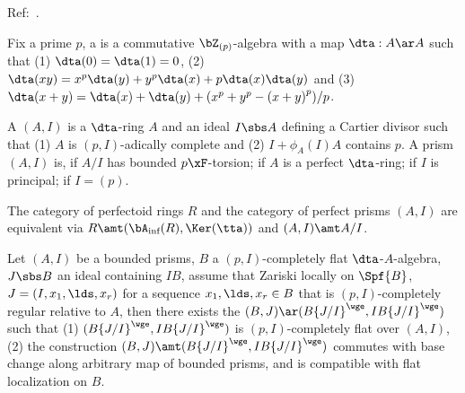 \documentclass[a4paper, twoside]{article}
\begin{document}











Ref:~\cite{BS2022Prisms}.

\begin{dfn}
	Fix a prime $p$, a  is a commutative $\bZ_{(p)}$-algebra with a map $\dta:A\ar A$ such that (1) $\dta(0)=\dta(1)=0$, (2) $\dta(xy)=x^{p}\dta(y)+y^{p}\dta(x)+p\dta(x)\dta(y)$ and (3) $\dta(x+y)=\dta(x)+\dta(y)+(x^{p}+y^{p}-{(x+y)}^{p})/p$.

	A  $(A,I)$ is a $\dta$-ring $A$ and an ideal $I\sbs A$ defining a Cartier divisor such that (1) $A$ is $(p,I)$-adically complete and (2) $I+\phi_{A}(I)A$ contains $p$. A prism $(A,I)$ is,  if $A/I$ has bounded $p\xF$-torsion;  if $A$ is a perfect $\dta$-ring;  if $I$ is principal;  if $I=(p)$.
\end{dfn}

\begin{thm}
	The category of perfectoid rings $R$ and the category of perfect prisms $(A,I)$ are equivalent via $R\amt(\bA_{\text{inf}}(R),\Ker(\tta))$ and $(A,I)\amt A/I$.
\end{thm}

\begin{thm}
	Let $(A,I)$ be a bounded prisms, $B$ a $(p,I)$-completely flat $\dta$-$A$-algebra, $J\sbs B$ an ideal containing $IB$, assume that Zariski locally on $\Spf{B}$, $J=(I,x_{1},\lds,x_{r})$ for a sequence $x_{1},\lds,x_{r}\in B$ that is $(p,I)$-completely regular relative to $A$, then there exists the  $(B,J)\ar (B{\{J/I\}}^{\wge},IB{\{J/I\}}^{\wge})$ such that (1) $(B{\{J/I\}}^{\wge},IB{\{J/I\}}^{\wge})$ is $(p,I)$-completely flat over $(A,I)$, (2) the construction $(B,J)\amt (B{\{J/I\}}^{\wge},IB{\{J/I\}}^{\wge})$ commutes with base change along arbitrary map of bounded prisms, and is compatible with flat localization on $B$.
\end{thm}
\end{document}

